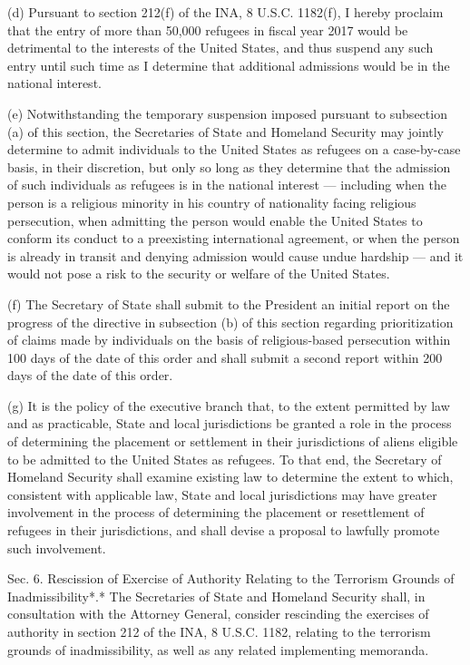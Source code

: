 (d) Pursuant to section 212(f) of the INA, 8 U.S.C. 1182(f), I hereby
proclaim that the entry of more than 50,000 refugees in fiscal year 2017
would be detrimental to the interests of the United States, and thus
suspend any such entry until such time as I determine that additional
admissions would be in the national interest.

(e) Notwithstanding the temporary suspension imposed pursuant to
subsection (a) of this section, the Secretaries of State and Homeland
Security may jointly determine to admit individuals to the United States
as refugees on a case-by-case basis, in their discretion, but only so
long as they determine that the admission of such individuals as
refugees is in the national interest --- including when the person is a
religious minority in his country of nationality facing religious
persecution, when admitting the person would enable the United States to
conform its conduct to a preexisting international agreement, or when
the person is already in transit and denying admission would cause undue
hardship --- and it would not pose a risk to the security or welfare of
the United States.

(f) The Secretary of State shall submit to the President an initial
report on the progress of the directive in subsection (b) of this
section regarding prioritization of claims made by individuals on the
basis of religious-based persecution within 100 days of the date of this
order and shall submit a second report within 200 days of the date of
this order.

(g) It is the policy of the executive branch that, to the extent
permitted by law and as practicable, State and local jurisdictions be
granted a role in the process of determining the placement or settlement
in their jurisdictions of aliens eligible to be admitted to the United
States as refugees. To that end, the Secretary of Homeland Security
shall examine existing law to determine the extent to which, consistent
with applicable law, State and local jurisdictions may have greater
involvement in the process of determining the placement or resettlement
of refugees in their jurisdictions, and shall devise a proposal to
lawfully promote such involvement.

Sec. 6. Rescission of Exercise of Authority Relating to the Terrorism
Grounds of Inadmissibility*.* The Secretaries of State and Homeland
Security shall, in consultation with the Attorney General, consider
rescinding the exercises of authority in section 212 of the INA, 8
U.S.C. 1182, relating to the terrorism grounds of inadmissibility, as
well as any related implementing memoranda.

